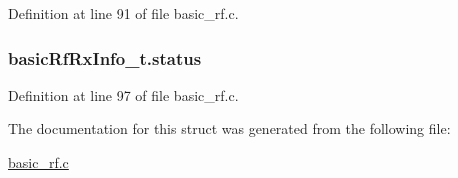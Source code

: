 Definition at line 91 of file basic\_\-rf.c.

\hypertarget{structbasic_rf_rx_info__t_a72422b4ffd3c9c466dff6959b3e16885}{
\subsubsection[{status}]{ {\bf basicRfRxInfo\_\-t.status}}}
\label{structbasic_rf_rx_info__t_a72422b4ffd3c9c466dff6959b3e16885}


Definition at line 97 of file basic\_\-rf.c.



The documentation for this struct was generated from the following file:\begin{DoxyCompactItemize}
\item 
\hyperlink{basic__rf_8c}{basic\_\-rf.c}\end{DoxyCompactItemize}
